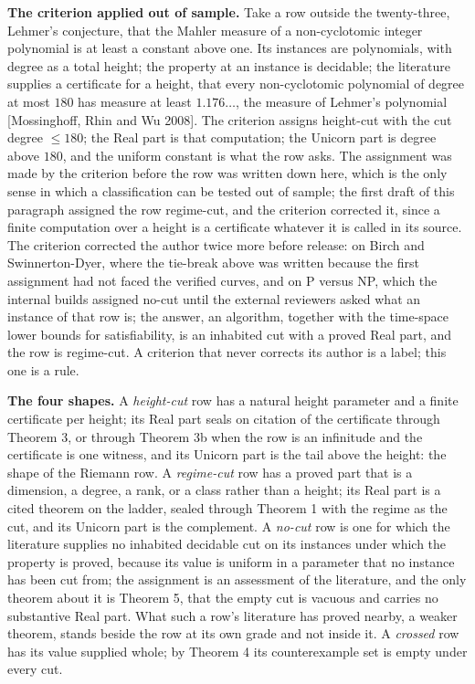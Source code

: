 \documentclass[10pt,twocolumn]{article}
\begin{document}
\textbf{The criterion applied out of sample.} Take a row outside the
twenty-three, Lehmer's conjecture, that the Mahler measure of a
non-cyclotomic integer polynomial is at least a constant above one. Its
instances are polynomials, with degree as a total height; the property
at an instance is decidable; the literature supplies a certificate for a
height, that every non-cyclotomic polynomial of degree at most \(180\)
has measure at least \(1.176\ldots\), the measure of Lehmer's polynomial
{[}Mossinghoff, Rhin and Wu 2008{]}. The criterion assigns height-cut
with the cut degree \(\le 180\); the Real part is that computation; the
Unicorn part is degree above \(180\), and the uniform constant is what
the row asks. The assignment was made by the criterion before the row
was written down here, which is the only sense in which a classification
can be tested out of sample; the first draft of this paragraph assigned
the row regime-cut, and the criterion corrected it, since a finite
computation over a height is a certificate whatever it is called in its
source. The criterion corrected the author twice more before release: on
Birch and Swinnerton-Dyer, where the tie-break above was written because
the first assignment had not faced the verified curves, and on P versus
NP, which the internal builds assigned no-cut until the external
reviewers asked what an instance of that row is; the answer, an
algorithm, together with the time-space lower bounds for satisfiability,
is an inhabited cut with a proved Real part, and the row is regime-cut.
A criterion that never corrects its author is a label; this one is a
rule.

\textbf{The four shapes.} A \emph{height-cut} row has a natural height
parameter and a finite certificate per height; its Real part seals on
citation of the certificate through Theorem 3, or through Theorem 3b
when the row is an infinitude and the certificate is one witness, and
its Unicorn part is the tail above the height: the shape of the Riemann
row. A \emph{regime-cut} row has a proved part that is a dimension, a
degree, a rank, or a class rather than a height; its Real part is a
cited theorem on the ladder, sealed through Theorem 1 with the regime as
the cut, and its Unicorn part is the complement. A \emph{no-cut} row is
one for which the literature supplies no inhabited decidable cut on its
instances under which the property is proved, because its value is
uniform in a parameter that no instance has been cut from; the
assignment is an assessment of the literature, and the only theorem
about it is Theorem 5, that the empty cut is vacuous and carries no
substantive Real part. What such a row's literature has proved nearby, a
weaker theorem, stands beside the row at its own grade and not inside
it. A \emph{crossed} row has its value supplied whole; by Theorem 4 its
counterexample set is empty under every cut.
\end{document}
